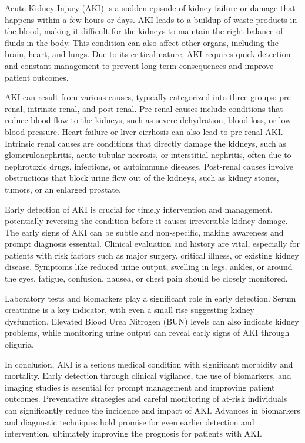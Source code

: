 \documentclass[../main.tex]{subfiles}
\begin{document}
Acute Kidney Injury (AKI) is a sudden episode of kidney failure or damage that happens within a few hours or days. 
AKI leads to a buildup of waste products in the blood, making it difficult for the kidneys to maintain the right balance of fluids in the body. 
This condition can also affect other organs, including the brain, heart, and lungs. Due to its critical nature, AKI requires quick detection and constant management to prevent long-term consequences and improve patient outcomes.

AKI can result from various causes, typically categorized into three groups: pre-renal, intrinsic renal, and post-renal. 
Pre-renal causes include conditions that reduce blood flow to the kidneys, such as severe dehydration, blood loss, or low blood pressure. 
Heart failure or liver cirrhosis can also lead to pre-renal AKI.
Intrinsic renal causes are conditions that directly damage the kidneys, such as glomerulonephritis, acute tubular necrosis, or interstitial nephritis, often due to nephrotoxic drugs, infections, or autoimmune diseases. %
Post-renal causes involve obstructions that block urine flow out of the kidneys, such as kidney stones, tumors, or an enlarged prostate.
 
Early detection of AKI is crucial for timely intervention and management, potentially reversing the condition before it causes irreversible kidney damage. 
The early signs of AKI can be subtle and non-specific, making awareness and prompt diagnosis essential. 
Clinical evaluation and history are vital, especially for patients with risk factors such as major surgery, critical illness, or existing kidney disease. 
Symptoms like reduced urine output, swelling in legs, ankles, or around the eyes, fatigue, confusion, nausea, or chest pain should be closely monitored.

Laboratory tests and biomarkers play a significant role in early detection. 
Serum creatinine is a key indicator, with even a small rise suggesting kidney dysfunction. 
Elevated Blood Urea Nitrogen (BUN) levels can also indicate kidney problems, while monitoring urine output can reveal early signs of AKI through oliguria. 

In conclusion, AKI is a serious medical condition with significant morbidity and mortality. 
Early detection through clinical vigilance, the use of biomarkers, and imaging studies is essential for prompt management and improving patient outcomes. 
Preventative strategies and careful monitoring of at-risk individuals can significantly reduce the incidence and impact of AKI. 
Advances in biomarkers and diagnostic techniques hold promise for even earlier detection and intervention, ultimately improving the prognosis for patients with AKI.
\end{document}

